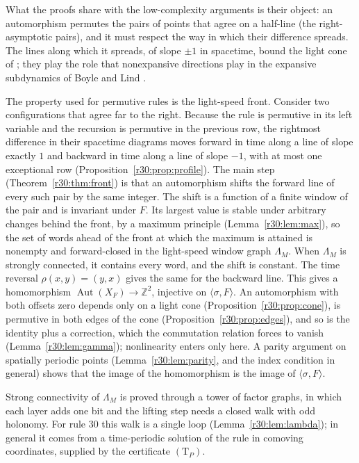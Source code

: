 \documentclass[11pt]{amsart}
\theoremstyle{definition}
\theoremstyle{remark}
\newcommand{\Z}{\mathbb{Z}}
\newcommand{\Aut}{\operatorname{Aut}}
\newcommand{\sh}{\sigma}
\begin{document}
What the proofs share with the low-complexity arguments is their object: an automorphism permutes the pairs of points that agree on a half-line (the right-asymptotic pairs), and it must respect the way in which their difference spreads. The lines along which it spreads, of slope $\pm1$ in spacetime, bound the light cone of \cite{CFK2019}; they play the role that nonexpansive directions play in the expansive subdynamics of Boyle and Lind \cite{BoyleLind1997}.

The property used for permutive rules is the light-speed front. Consider two configurations that agree far to the right. Because the rule is permutive in its left variable and the recursion is permutive in the previous row, the rightmost difference in their spacetime diagrams moves forward in time along a line of slope exactly $1$ and backward in time along a line of slope $-1$, with at most one exceptional row (Proposition~\ref{r30:prop:profile}). The main step (Theorem~\ref{r30:thm:front}) is that an automorphism shifts the forward line of every such pair by the same integer. The shift is a function of a finite window of the pair and is invariant under $F$. Its largest value is stable under arbitrary changes behind the front, by a maximum principle (Lemma~\ref{r30:lem:max}), so the set of words ahead of the front at which the maximum is attained is nonempty and forward-closed in the light-speed window graph $\Lambda_M$. When $\Lambda_M$ is strongly connected, it contains every word, and the shift is constant. The time reversal $\rho(x,y)=(y,x)$ gives the same for the backward line. This gives a homomorphism $\Aut(X_F)\to\Z^2$, injective on $\langle\sh,F\rangle$. An automorphism with both offsets zero depends only on a light cone (Proposition~\ref{r30:prop:cone}), is permutive in both edges of the cone (Proposition~\ref{r30:prop:edges}), and so is the identity plus a correction, which the commutation relation forces to vanish (Lemma~\ref{r30:lem:gamma}); nonlinearity enters only here. A parity argument on spatially periodic points (Lemma~\ref{r30:lem:parity}, and the index condition in general) shows that the image of the homomorphism is the image of $\langle\sh,F\rangle$.

Strong connectivity of $\Lambda_M$ is proved through a tower of factor graphs, in which each layer adds one bit and the lifting step needs a closed walk with odd holonomy. For rule $30$ this walk is a single loop (Lemma~\ref{r30:lem:lambda}); in general it comes from a time-periodic solution of the rule in comoving coordinates, supplied by the certificate $(\mathrm T_P)$.
\end{document}
